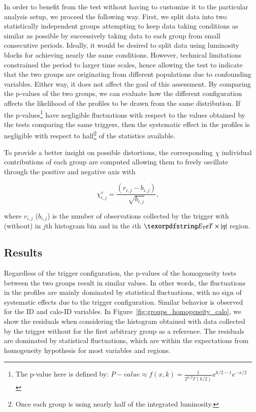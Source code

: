 In order to benefit from the test without having to customize it to the particular analysis setup, we proceed the following way. First, we split data into two
statistically independent groups attempting to keep data taking conditions as
similar as possible by successively taking data to each group from small
consecutive periods. Ideally, it would be desired to split data using luminosity
blocks for achieving nearly the same conditions. However, technical limitations
constrained the period to larger time scales, hence allowing the test to
indicate that the two groups are originating from different populations due to
confounding variables. 
Either way, it does not affect the goal of this assessment. By comparing the p-values of the two groups, we can evaluate how the different configuration affects the likelihood of the profiles to be drawn from the same distribution. If the p-values\footnote{The p-value here is defined by: $P-value \approx f(x, k) = \frac{1}{2^{k/2}\Gamma(k/2)}x^{k/2 -1}e^{-x/2}$} have negligible fluctuations with respect to the values obtained by the tests comparing the same triggers, then the systematic effect in the profiles is negligible with respect to half\footnote{Once each group is using nearly half of the integrated luminosity.} of the statistics available.



To provide a better insight on possible distortions, the corresponding $\chi$
individual contributions of each group are computed allowing them to freely
oscillate through the positive and negative axis with

\begin{equation}
  \chi_{i,j}^{s} = \frac{(r_{i,j} - b_{i,j})}{\sqrt{b_{i,j}}},
  \label{eq:signed_chi}
\end{equation}

\noindent where $r_{i,j}$ ($b_{i,j}$) is the number of observations collected by
the trigger with (without) \rnn{} in $j$th histogram bin and in the $i$th
$\et{}\times\abseta{}$ region.


\subsection{Results}\label{top:agreement_homogeneity_results}




Regardless of the trigger configuration, the p-values of the homogeneity tests between the two groups result in similar values. In other words, the fluctuations in the profiles are mainly dominated by statistical fluctuations, with no sign of systematic effects due to the trigger configuration. Similar behavior is observed for the ID and calo-ID variables. In Figure~\ref{fig:groups_homogeneity_calo}, we show the residuals when considering the histogram obtained with data collected by the trigger without \rnn{} for the first arbitrary group as a reference. The residuals are dominated by statistical fluctuations, which are within the expectations from homogeneity hypothesis for most variables and regions.


